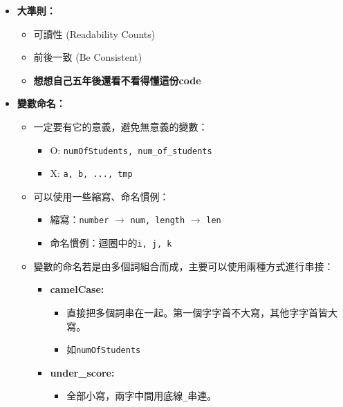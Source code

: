 \documentclass[a4paper, 11pt, oneside]{book}
\begin{document}
\begin{itemize}
    \item \textbf{大準則：}
          \begin{itemize}
              \item 可讀性 (Readability Counts)
              \item 前後一致 (Be Consistent)
              \item \textbf{想想自己五年後還看不看得懂這份code}
          \end{itemize}
    \item \textbf{變數命名：}
          \begin{itemize}
              \item 一定要有它的意義，避免無意義的變數：
                    \begin{itemize}
                        \item O: \texttt{numOfStudents, num\_of\_students}
                        \item X: \texttt{a, b, ..., tmp}
                    \end{itemize}
              \item 可以使用一些縮寫、命名慣例：
                    \begin{itemize}
                        \item 縮寫：\texttt{number}  $\rightarrow$ \texttt{num, length} $\rightarrow$ \texttt{len}
                        \item 命名慣例：迴圈中的\texttt{i, j, k}
                    \end{itemize}
              \item 變數的命名若是由多個詞組合而成，主要可以使用兩種方式進行串接：
                    \begin{itemize}
                        \item \textbf{camelCase: }
                              \begin{itemize}
                                  \item 直接把多個詞串在一起。第一個字字首不大寫，其他字字首皆大寫。
                                  \item 如\texttt{numOfStudents}
                              \end{itemize}
                        \item \textbf{under\_score: }
                              \begin{itemize}
                                  \item 全部小寫，兩字中間用底線\texttt{\_}串連。

\end{itemize}
\end{itemize}
\end{itemize}
\end{itemize}
\end{document}

